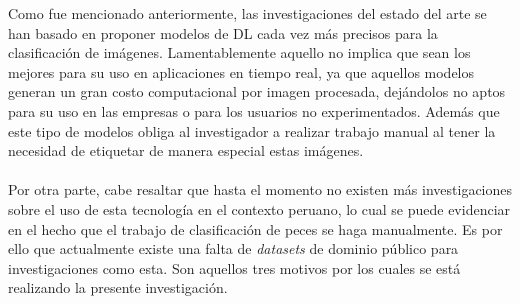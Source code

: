 Como fue mencionado anteriormente, las investigaciones del estado del arte se han basado en proponer modelos de DL cada vez más precisos para la clasificación de imágenes. Lamentablemente aquello no implica que sean los mejores para su uso en aplicaciones en tiempo real, ya que aquellos modelos generan un gran costo computacional por imagen procesada, dejándolos no aptos para su uso en las empresas o para los usuarios no experimentados. Además que este tipo de modelos obliga al investigador a realizar trabajo manual al tener la necesidad de etiquetar de manera especial estas imágenes. \\\\
Por otra parte, cabe resaltar que hasta el momento no existen más investigaciones sobre el uso de esta tecnología en el contexto peruano, lo cual se puede evidenciar en el hecho que el trabajo de clasificación de peces se haga manualmente. Es por ello que actualmente existe una falta de \textit{datasets} de dominio público para investigaciones como esta. Son  aquellos tres motivos por los cuales se está realizando la presente investigación.  